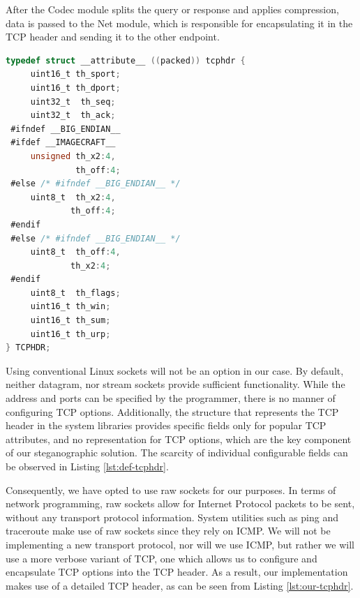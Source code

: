 After the Codec module splits the query or response and applies compression,
data is passed to the Net module, which is responsible for encapsulating it in
the TCP header and sending it to the other endpoint.

\begin{lstlisting}[caption={Default TCP Header Structure},
                   label={lst:def-tcphdr},
                   basicstyle=\footnotesize,
                   captionpos=b,
                   frame=single,
                   language=C
                  ]
typedef struct __attribute__ ((packed)) tcphdr {
     uint16_t th_sport;
     uint16_t th_dport;
     uint32_t  th_seq;
     uint32_t  th_ack;
 #ifndef __BIG_ENDIAN__
 #ifdef __IMAGECRAFT__
     unsigned th_x2:4,
              th_off:4;
 #else /* #ifndef __BIG_ENDIAN__ */
     uint8_t  th_x2:4,
             th_off:4;
 #endif
 #else /* #ifndef __BIG_ENDIAN__ */
     uint8_t  th_off:4,
             th_x2:4;
 #endif
     uint8_t  th_flags;
     uint16_t th_win;
     uint16_t th_sum;
     uint16_t th_urp;
} TCPHDR;
\end{lstlisting}

Using conventional Linux sockets will not be an option in our case. By default,
neither datagram, nor stream sockets provide sufficient functionality. While the
address and ports can be specified by the programmer, there is no manner of
configuring TCP options. Additionally, the structure that represents the TCP header
in the system libraries provides specific fields only for popular TCP attributes,
and no representation for TCP options, which are the key component of our
steganographic solution. The scarcity of individual configurable fields can be
observed in Listing \ref{lst:def-tcphdr}.

Consequently, we have opted to use raw sockets for our purposes. In terms of
network programming, raw sockets allow for Internet Protocol packets to be sent,
without any transport protocol information. System utilities such as ping and
traceroute make use of raw sockets since they rely on ICMP. We will not be
implementing a new transport protocol, nor will we use ICMP, but rather we will
use a more verbose variant of TCP, one which allows us to configure and
encapsulate TCP options into the TCP header. As a result, our implementation
makes use of a detailed TCP header, as can be seen from Listing \ref{lst:our-tcphdr}.

